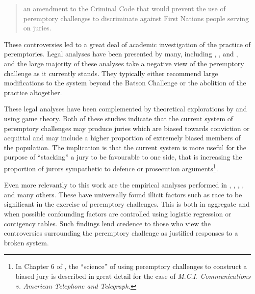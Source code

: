 \begin{quote}
  an amendment to the Criminal Code that would prevent the use of peremptory challenges to discriminate against First Nations
  people serving on juries.
\end{quote}

These controversies led to a great deal of academic investigation of the practice of peremptories. Legal analyses have been
presented by many, including \cite{hoffman1997}, \cite{broderick1992}, and \cite{Nunn1993}, and the large majority of these
analyses take a negative view of the peremptory challenge as it currently stands. They typically either recommend large
modifications to the system beyond the Batson Challenge or the abolition of the practice altogether.

These legal analyses have been complemented by theoretical explorations by \cite{ford2010} and \cite{flanagan2015} using game
theory. Both of these studies indicate that the current system of peremptory challenges may produce juries which are biased
towards conviction or acquittal and may include a higher proportion of extremely biased members of the population. The
implication is that the current system is more useful for the purpose of ``stacking'' a jury to be favourable to one side, that is
increasing the proportion of jurors sympathetic to defence or prosecution arguments\footnote{In Chapter 6 of
  \cite{hansvidjudging}, the ``science'' of using peremptory challenges to construct a biased jury is described in great detail
  for the case of \textit{M.C.I. Communications v. American Telephone and Telegraph}.}.

Even more relevantly to this work are the empirical analyses performed in \cite{PerempChalMurder}, \cite{JurySunshineProj},
\cite{StubbornLegacy}, \cite{baldus2012}, and many others. These have
universally found illicit factors such as race to be significant in
the exercise of peremptory challenges. This is both in aggregate and when possible confounding factors are controlled using
logistic regression or contigency tables. Such findings lend credence to those who view the controversies surrounding the
peremptory challenge as justified responses to a broken system.


